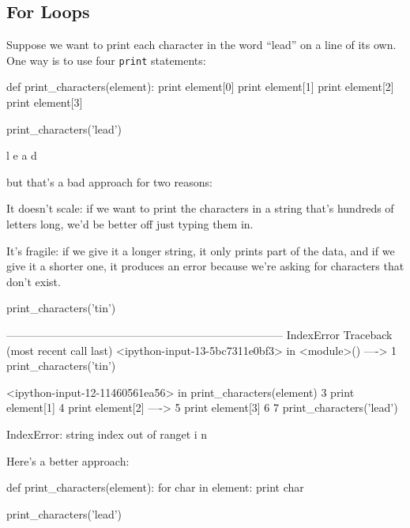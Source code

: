 \documentclass{book}
\begin{document}
\subsection{For Loops}

Suppose we want to print each character in the word ``lead'' on a line
of its own. One way is to use four \texttt{print} statements:

\begin{VerbIn}
def print_characters(element):
    print element[0]
    print element[1]
    print element[2]
    print element[3]

print_characters('lead')
\end{VerbIn}

\begin{VerbOut}
l
e
a
d
\end{VerbOut}

but that's a bad approach for two reasons:

\begin{swcenumerate}
\item
  It doesn't scale: if we want to print the characters in a string
  that's hundreds of letters long, we'd be better off just typing them
  in.
\item
  It's fragile: if we give it a longer string, it only prints part of
  the data, and if we give it a shorter one, it produces an error
  because we're asking for characters that don't exist.
\end{swcenumerate}

\begin{VerbIn}
print_characters('tin')
\end{VerbIn}

\begin{VerbErr}
---------------------------------------------------------------------------
IndexError                                Traceback (most recent call last)
<ipython-input-13-5bc7311e0bf3> in <module>()
----> 1 print_characters('tin')

<ipython-input-12-11460561ea56> in print_characters(element)
      3     print element[1]
      4     print element[2]
----> 5     print element[3]
      6
      7 print_characters('lead')

IndexError: string index out of ranget
i
n
\end{VerbErr}

Here's a better approach:

\begin{VerbIn}
def print_characters(element):
    for char in element:
        print char

print_characters('lead')
\end{VerbIn}
\end{document}
